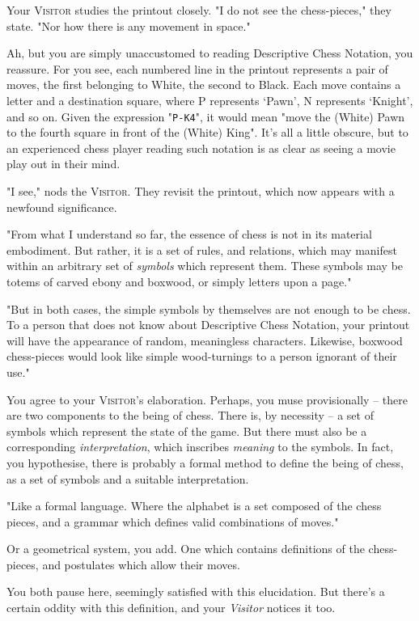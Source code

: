 \noindent
Your \textsc{Visitor} studies the printout closely. "I do not see the chess-pieces," they state. "Nor how there is any movement in space."

Ah, but you are simply unaccustomed to reading Descriptive Chess Notation, you reassure. For you see, each numbered line in the printout represents a pair of moves, the first belonging to White, the second to Black. Each move contains a letter and a destination square, where P represents `Pawn', N represents `Knight', and so on. Given the expression "\texttt{P-K4}", it would mean "move the (White) Pawn to the fourth square in front of the (White) King". It's all a little obscure, but to an experienced chess player reading such notation is as clear as seeing a movie play out in their mind.

"I see," nods the \textsc{Visitor}. They revisit the printout, which now appears with a newfound significance.

"From what I understand so far, the essence of chess is not in its material embodiment. But rather, it is a set of rules, and relations, which may manifest within an arbitrary set of \emph{symbols} which represent them. These symbols may be totems of carved ebony and boxwood, or simply letters upon a page."

"But in both cases, the simple symbols by themselves are not enough to be chess. To a person that does not know about Descriptive Chess Notation, your printout will have the appearance of random, meaningless characters. Likewise, boxwood chess-pieces would look like simple wood-turnings to a person ignorant of their use."

You agree to your \textsc{Visitor}'s elaboration. Perhaps, you muse provisionally -- there are two components to the being of chess. There is, by necessity -- a set of symbols which represent the state of the game. But there must also be a corresponding \emph{interpretation}, which inscribes \emph{meaning} to the symbols. In fact, you hypothesise, there is probably a formal method to define the being of chess, as a set of symbols and a suitable interpretation.

"Like a formal language. Where the alphabet is a set composed of the chess pieces, and a grammar which defines valid combinations of moves."

Or a geometrical system, you add. One which contains definitions of the chess-pieces, and postulates which allow their moves.

You both pause here, seemingly satisfied with this elucidation. But there's a certain oddity with this definition, and your \emph{Visitor} notices it too.

